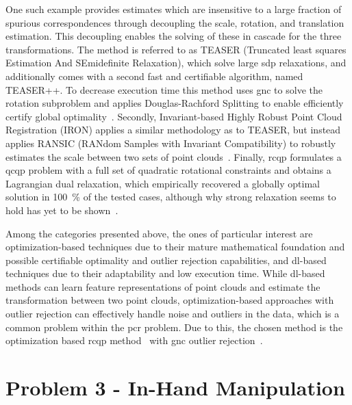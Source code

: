 One such example provides estimates which are insensitive to a large fraction of spurious correspondences through decoupling the scale, rotation, and translation estimation. This decoupling enables the solving of these in cascade for the three transformations. The method is referred to as TEASER (Truncated least squares Estimation And SEmidefinite Relaxation), which solve large \gls{sdp} relaxations, and additionally comes with a second fast and certifiable algorithm, named TEASER++. To decrease execution time this method uses \gls{gnc} to solve the rotation subproblem and applies Douglas-Rachford Splitting to enable efficiently certify global optimality~\cite{teaser:-fast-and-certifiable-point-cloud-registration}. Secondly, Invariant-based Highly Robust Point Cloud Registration (IRON) applies a similar methodology as to TEASER, but instead applies RANSIC (RANdom Samples with Invariant Compatibility) to robustly estimates the scale between two sets of point clouds~\cite{iron:-invariant-based-highly-robust-point-cloud-registration}. Finally, \gls{rcqp} formulates a \gls{qcqp} problem with a full set of quadratic rotational constraints and obtains a Lagrangian dual relaxation, which empirically recovered a globally optimal solution in \SI{100}{\percent} of the tested cases, although why strong relaxation seems to hold has yet to be shown~\cite{convex-global-3d-registration-with-lagrangian-duality}. \medskip

Among the categories presented above, the ones of particular interest are optimization-based techniques due to their mature mathematical foundation and possible certifiable optimality and outlier rejection capabilities, and \gls{dl}-based techniques due to their adaptability and low execution time. While \gls{dl}-based methods can learn feature representations of point clouds and estimate the transformation between two point clouds, optimization-based approaches with outlier rejection can effectively handle noise and outliers in the data, which is a common problem within the \gls{pcr} problem. Due to this, the chosen method is the optimization based \gls{rcqp} method~\cite{convex-global-3d-registration-with-lagrangian-duality} with \gls{gnc} outlier rejection~\cite{graduated-non-convexity-for-robust-spatial-perception:-from-non-minimal-solvers-to-global-outlier-rejection}.



\section{Problem 3 - In-Hand Manipulation}\label{sec:lit-rev-problem-3}

